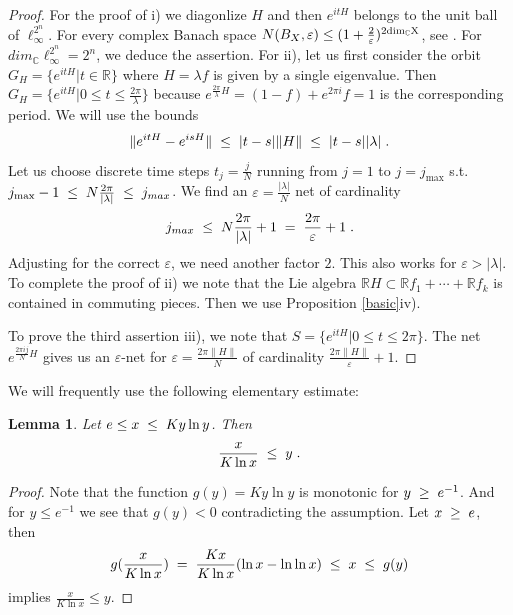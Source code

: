 \documentclass[12pt, a4-paper]{amsart}
\numberwithin{equation}{section}
\newcommand{\kl}{\pl \le \pl}
\newcommand{\gl}{\pl \ge \pl}
\newcommand{\lel}{\pl = \pl}
\newcommand{\rz}{{\mathbb R}}
\newcommand{\cz}{{\mathbb C}}
\newcommand{\pl}{\hspace{.1cm}}
\newcommand{\la}{\lambda}
\newcommand{\eps}{\varepsilon}
\newtheorem{lemma}{Lemma}[section]
\begin{document}
\begin{proof} For the proof of i) we diagonlize $H$ and then $e^{itH}$ belongs to the unit ball of $\ell_{\infty}^{2^n}$. For every complex Banach space $N(B_{X},\eps)\le (1+\frac{2}{\eps})^{2{\rm dim_{\cz} X}}$, see \cite{PSV}. For $dim_{\cz}\ell_{\infty}^{2^n}=2^n$, we 
deduce the assertion. For ii), let us first consider the orbit $G_H =\{e^{itH}|t\in \rz\}$ where $H=\la f$ is given by a single 
eigenvalue. Then $G_H = \{e^{itH}| 0\le t\le \frac{2\pi}{\la}\}$ because $e^{\frac{2\pi}{\la}H}=(1-f)+e^{2\pi i}f=1$ is the
corresponding period. We will use the bounds
 \[ 
 \|e^{itH}-e^{isH}\|\kl |t-s| \|H\|\kl |t-s||\la| \pl .
 \] 
Let us choose discrete time steps $t_j=\frac{j}{N}$ running from $j=1$ to $j=j_{\max}$ s.t. $j_{\max}-1\kl N\frac{2\pi}{|\la|}\kl j_{max}$. We find an $\eps=\frac{|\la|}{N}$ net of cardinality
 \[ j_{max}\kl N\frac{2\pi}{|\la|}+1 \lel \frac{2\pi}{\eps}+1 \pl .\] 
Adjusting for the correct $\eps$, we need another factor $2$. This also works for $\eps>|\la|$. To complete the proof of ii) we note that the Lie algebra   $\rz H\subset \rz f_1+\cdots +\rz f_k$ is contained in  commuting pieces. Then we use Proposition \ref{basic}iv). 

To prove the third  assertion iii), we note that $S=\{e^{itH}|0\le t\le 2\pi\}$. The net $e^{\frac{2\pi i j}{N}H}$ gives us an $\eps$-net for $\eps=\frac{2\pi\|H\|}{N}$ of cardinality $\frac{2\pi\|H\|}{\eps}+1$. 
\end{proof} 
We will frequently use the following elementary estimate: 
\begin{lemma}\label{ylny} Let $e\le x\kl K y\ln y$. Then
 \[ \frac{x}{K\ln x} \kl y \pl. \]
\end{lemma}
\begin{proof} Note that the function $g(y)=Ky\ln y$ is monotonic for $y\gl e^{-1}$. And for $y\le e^{-1}$ we see that $g(y)<0$ contradicting the assumption.    
Let $x\gl e$, then 
 \[ g(\frac{x}{K \ln x})\lel \frac{Kx}{K \ln x} (\ln x-
 \ln \ln x)\kl x \kl g(y) \]
implies $\frac{x}{K\ln x}\le y$.     
\end{proof}
\end{document}
